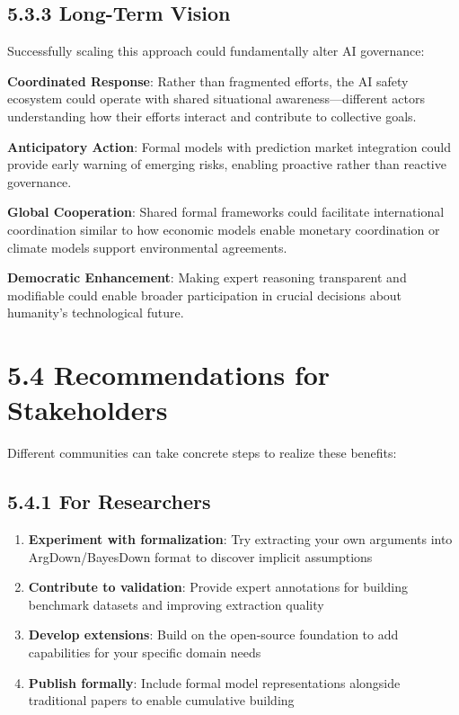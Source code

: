 \documentclass[
  11pt,
  letterpaper,
]{book}
\begin{document}
\subsection*{5.3.3 Long-Term Vision}\label{sec-long-term-vision}

Successfully scaling this approach could fundamentally alter AI
governance:

\textbf{Coordinated Response}: Rather than fragmented efforts, the AI
safety ecosystem could operate with shared situational
awareness---different actors understanding how their efforts interact
and contribute to collective goals.

\textbf{Anticipatory Action}: Formal models with prediction market
integration could provide early warning of emerging risks, enabling
proactive rather than reactive governance.

\textbf{Global Cooperation}: Shared formal frameworks could facilitate
international coordination similar to how economic models enable
monetary coordination or climate models support environmental
agreements.

\textbf{Democratic Enhancement}: Making expert reasoning transparent and
modifiable could enable broader participation in crucial decisions about
humanity's technological future.

\section*{5.4 Recommendations for
Stakeholders}\label{sec-recommendations}


Different communities can take concrete steps to realize these benefits:

\subsection*{5.4.1 For
Researchers}\label{sec-researcher-recommendations}

\begin{enumerate}
\def\labelenumi{\arabic{enumi}.}
\item
  \textbf{Experiment with formalization}: Try extracting your own
  arguments into ArgDown/BayesDown format to discover implicit
  assumptions
\item
  \textbf{Contribute to validation}: Provide expert annotations for
  building benchmark datasets and improving extraction quality
\item
  \textbf{Develop extensions}: Build on the open-source foundation to
  add capabilities for your specific domain needs
\item
  \textbf{Publish formally}: Include formal model representations
  alongside traditional papers to enable cumulative building
\end{enumerate}
\end{document}
